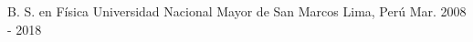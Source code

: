 

\begin{cventries}

  \cventry
    {B. S. en Física} %
    {Universidad Nacional Mayor de San Marcos} %
    {Lima, Perú} %
    {Mar. 2008 - 2018} %
    {
    }
\end{cventries}
